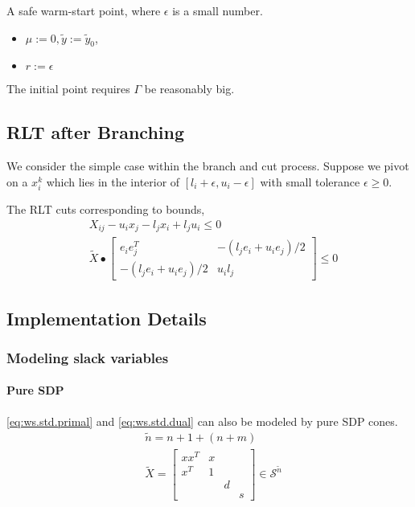\documentclass[../main]{subfiles}
\begin{document}
A safe warm-start point, where \(\epsilon\) is a small number.
\begin{itemize}
    \item \(\mu := 0, \tilde{y} := \tilde y_0\),
    \item \(r := \epsilon \)
\end{itemize}

The initial point requires \(\Gamma\) be reasonably big.



\subsection{RLT after Branching}
We consider the simple case within the branch and cut process. Suppose we pivot on a \(x_i^k\) which lies in the interior of \(\left[l_i + \epsilon, u_i -\epsilon\right]\) with small tolerance \(\epsilon \ge 0\).

The RLT cuts corresponding to bounds,
\begin{align}
    \label{eq:ws.rlt.left} & X_{ij} - u_i x_j - l_j x_i + l_j u_i \le 0        \\
    \label{eq:ws.rlt.mat}  & \tilde X \bullet \begin{bmatrix}
        e_ie_j^T                  & - (l_j e_i + u_i e_j) / 2 \\
        - (l_j e_i + u_i e_j) / 2 & u_i l_j
    \end{bmatrix} \le 0
\end{align}

\subsection{Implementation Details}
\subsubsection{Modeling slack variables}
\paragraph{Pure SDP}
\eqref{eq:ws.std.primal} and \eqref{eq:ws.std.dual} can also be modeled by pure SDP cones.
\begin{equation}
    \begin{aligned}
         & \tilde n = n + 1 + (n + m)                                       \\
         & \tilde{X} = \begin{bmatrix}
            xx^T & x &   &   \\
            x^T  & 1 &   &   \\
                 &   & d &   \\
                 &   &   & s
        \end{bmatrix}\in \mathscr S^{\tilde{n}}
    \end{aligned}
\end{equation}
\end{document}
